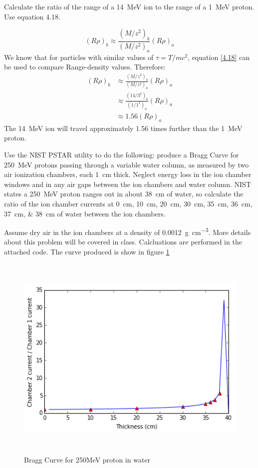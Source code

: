 \documentclass{hw}
\begin{document}
Calculate the ratio of the range of a \SI{14}{\mega\electronvolt}  ion to the range of a \SI{1}{\mega\electronvolt} proton. Use equation 4.18.

\begin{equation}
	\left( R \rho \right)_b \approx \frac{\left( M/z^2 \right)_b}{\left( M / z^2 \right)_a} \left( R \rho \right)_a \tag{4.18}
	\label{4.18}
\end{equation}
\solution
We know that for particles with similar values of $ \tau = T / m c^2 $, equation \ref{4.18} can be used to compare Range-density values. Therefore:
\begin{align*}
	\left( R \rho \right)_b &\approx \frac{\left( M/z^2 \right)_b}{\left( M / z^2 \right)_a} \left( R \rho \right)_a \\
	&\approx \frac{\left( 14/3^2 \right)_b}{\left( 1 / 1^2 \right)_a} \left( R \rho \right)_a \\
	&\approx 1.56 \left( R \rho \right)_a
\end{align*}
The \SI{14}{\mega\electronvolt}  ion will travel approximately \num{1.56} times further than the \SI{1}{\mega\electronvolt} proton.

\problem{}
Use the NIST PSTAR utility to do the following: produce a Bragg Curve for \SI{250}{\mega\electronvolt} protons passing through a variable water column, as measured by two air ionization chambers, each \SI{1}{\centi\meter} thick. Neglect energy loss in the ion chamber windows and in any air gaps between the ion chambers and water column. NIST states a \SI{250}{\mega\electronvolt} proton ranges out in about \SI{38}{\centi\meter} of water, so calculate the ratio of the ion chamber currents at \SIlist{0;10;20;30;35;36;37;38}{\centi\meter} of water between the ion chambers.

Assume dry air in the ion chambers at a density of \SI{0.0012}{\gram\per\centi\meter^3}. More details about this problem will be covered in class.
\solution
Calcluations are performed in the attached code. The curve produced is show in figure \ref{fig:bragg}

\begin{figure}[h]
	\includegraphics[width=15cm,height=10cm,keepaspectratio]{bragg}
	\caption{Bragg Curve for 250MeV proton in water}
	\label{fig:bragg}
\end{figure}
\end{document}
